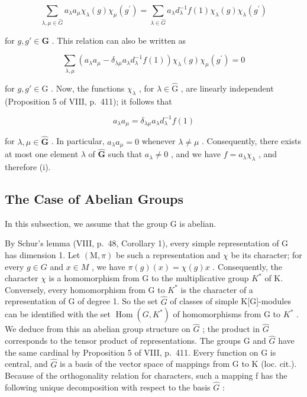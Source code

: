 \[
\sum_ {\lambda , \mu \in \widehat {G}} a _ {\lambda}   a _ {\mu}   \chi_ {\lambda} (g)   \chi_ {\mu} (g ^ {\prime}) = \sum_ {\lambda \in \widehat {G}} a _ {\lambda}   d _ {\lambda} ^ {- 1}   f (1)   \chi_ {\lambda} (g)   \chi_ {\lambda} (g ^ {\prime})\tag{37}
\]

for \(g, g' \in \mathbf{G}\) . This relation can also be written as

\[
\sum_ {\lambda , \mu} (a _ {\lambda} a _ {\mu} - \delta_ {\lambda \mu} a _ {\lambda} d _ {\lambda} ^ {- 1} f (1)) \chi_ {\lambda} (g) \chi_ {\mu} (g ^ {\prime}) = 0\tag{38}
\]

for \(g, g' \in \mathrm{G}\) . Now, the functions \(\chi_{\lambda}\) , for \(\lambda \in \widehat{\mathrm{G}}\) , are linearly independent (Proposition 5 of VIII, p.~411); it follows that

\[
a _ {\lambda} a _ {\mu} = \delta_ {\lambda \mu} a _ {\lambda} d _ {\lambda} ^ {- 1} f (1)
\]

for \(\lambda, \mu \in \widehat{\mathbf{G}}\) . In particular, \(a_{\lambda}a_{\mu} = 0\) whenever \(\lambda \neq \mu\) . Consequently, there exists at most one element \(\lambda\) of \(\widehat{\mathbf{G}}\) such that \(a_{\lambda} \neq 0\) , and we have \(f = a_{\lambda}\chi_{\lambda}\) , and therefore (i).

\subsection{The Case of Abelian Groups}

In this subsection, we assume that the group \(\mathrm{G}\) is abelian.

By Schur's lemma (VIII, p.~48, Corollary 1), every simple representation of G has dimension 1. Let \((\mathrm{M},\pi)\) be such a representation and \(\chi\) be its character; for every \(g\in G\) and \(x\in M\) , we have \(\pi(g)(x)=\chi(g)x\) . Consequently, the character \(\chi\) is a homomorphism from G to the multiplicative group \(K^{*}\) of K. Conversely, every homomorphism from G to \(K^{*}\) is the character of a representation of G of degree 1. So the set \(\widehat{G}\) of classes of simple K{[}G{]}-modules can be identified with the set \(\operatorname{Hom}(G,K^{*})\) of homomorphisms from G to \(K^{*}\) . We deduce from this an abelian group structure on \(\widehat{G}\) ; the product in \(\widehat{G}\) corresponds to the tensor product of representations. The groups G and \(\widehat{G}\) have the same cardinal by Proposition 5 of VIII, p.~411. Every function on G is central, and \(\widehat{G}\) is a basis of the vector space of mappings from G to K (loc. cit.). Because of the orthogonality relation for characters, such a mapping f has the following unique decomposition with respect to the basis \(\widehat{G}\) :

